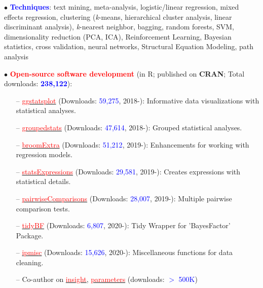 \documentclass[10pt]{article}
\begin{document}
	$\bullet$ \textcolor{blue}{\textbf{Techniques}}: text mining, meta-analysis, logistic/linear regression, mixed effects regression, clustering \hspace*{0.1in}(\textit{k}-means, hierarchical cluster analysis, linear discriminant analysis), \textit{k}-nearest neighbor, bagging, random \hspace*{0.1in}forests, SVM, dimensionality reduction (PCA, ICA), Reinforcement Learning, Bayesian statistics, cross \hspace*{0.1in}validation, neural networks, Structural Equation Modeling, path analysis
	\miniskip
	
	$\bullet$ \textcolor{red}{\textbf{Open-source software development}} (in R; published on \textbf{CRAN}; Total downloads: \textcolor{blue}{\textbf{238,122}}):
	 \vspace*{-0.09in}
	 
	\begin{itemize}
	\itemsep-0.1em
	\item[--] \href{https://indrajeetpatil.github.io/ggstatsplot/}{\textcolor{red}{ggstatsplot}} (Downloads: \textcolor{blue}{59,275}, 2018-): Informative data visualizations with statistical analyses.
	\item[--] \href{https://indrajeetpatil.github.io/groupedstats/}{\textcolor{red}{groupedstats}} (Downloads: \textcolor{blue}{47,614}, 2018-): Grouped statistical analyses.
	\item[--] \href{https://indrajeetpatil.github.io/groupedstats/}{\textcolor{red}{broomExtra}} (Downloads: \textcolor{blue}{51,212}, 2019-): Enhancements for working with regression models.
	\item[--] \href{https://indrajeetpatil.github.io/statsExpressions/}{\textcolor{red}{statsExpressions}} (Downloads: \textcolor{blue}{29,581}, 2019-): Creates expressions with statistical details.
	\item[--] \href{https://indrajeetpatil.github.io/pairwiseComparisons/}{\textcolor{red}{pairwiseComparisons}} (Downloads: \textcolor{blue}{28,007}, 2019-): Multiple pairwise comparison tests.
    \item[--] \href{https://indrajeetpatil.github.io/tidyBF/}{\textcolor{red}{tidyBF}} (Downloads: \textcolor{blue}{6,807}, 2020-): Tidy Wrapper for 'BayesFactor' Package.
	\item[--] \href{https://indrajeetpatil.github.io/ipmisc/}{\textcolor{red}{ipmisc}} (Downloads: \textcolor{blue}{15,626}, 2020-): Miscellaneous functions for data cleaning.	
	\item[--] Co-author on \href{https://easystats.github.io/insight/}{\textcolor{red}{insight}}, \href{https://easystats.github.io/parameters/}{\textcolor{red}{parameters}} (downloads: \textcolor{blue}{$>$ 500K})
	\end{itemize}
	
\end{document}
